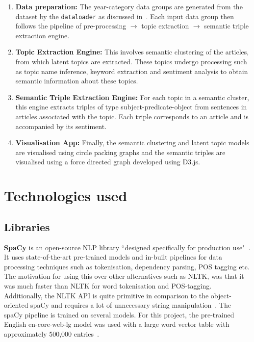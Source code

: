 \begin{enumerate}
    \item \textbf{Data preparation:} The year-category data groups are generated from the dataset by the \texttt{dataloader} as discussed in~. Each input data group then follows the pipeline of pre-processing $\rightarrow$ topic extraction $\rightarrow$ semantic triple extraction engine. 
    
    \item \textbf{Topic Extraction Engine:} This involves semantic clustering of the articles, from which latent topics are extracted. These topics undergo processing such as topic name inference, keyword extraction and sentiment analysis to obtain semantic information about these topics.
    
    \item \textbf{Semantic Triple Extraction Engine:} For each topic in a semantic cluster, this engine extracts triples of type subject-predicate-object from sentences in articles associated with the topic. Each triple corresponds to an article and is accompanied by its sentiment.
    
    \item \textbf{Visualisation App:} Finally, the semantic clustering and latent topic models are visualised using circle packing graphs and the semantic triples are visualised using a force directed graph developed using D3.js. 
    

\end{enumerate}
\section{Technologies used}
\vspace{-1ex}
\subsection{Libraries} \label{libraries}

\textbf{SpaCy} is an open-source NLP library ``designed specifically for production use"~\cite{spacy}. It uses state-of-the-art pre-trained models and in-built pipelines for data processing techniques such as tokenisation, dependency parsing, POS tagging etc. The motivation for using this over other alternatives such as NLTK, was that it was much faster than NLTK for word tokenisation and POS-tagging. Additionally, the NLTK API is quite primitive in comparison to the object-oriented spaCy and requires a lot of unnecessary string manipulation~\cite{spacy-nltk}. The spaCy pipeline is trained on several models. For this project, the pre-trained English en-core-web-lg model was used with a large word vector table with approximately 500,000 entries~\cite{spacy}.  

